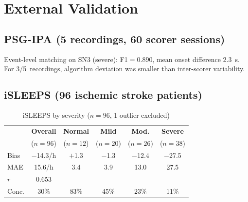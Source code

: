 \documentclass[11pt,a4paper]{article}
\begin{document}
\section{External Validation}

\subsection{PSG-IPA (5 recordings, 60 scorer sessions)}

\begin{table}[H]
\centering\small
\caption{PSG-IPA: algorithm vs.\ 12 scorers per recording}
\end{table}

\noindent Event-level matching on SN3 (severe): F1$=0.890$, mean onset
difference 2.3~s. For 3/5~recordings, algorithm deviation was smaller
than inter-scorer variability.

\subsection{iSLEEPS (96 ischemic stroke patients)}

\begin{table}[H]
\centering\small
\caption{iSLEEPS by severity ($n=96$, 1 outlier excluded)}
\begin{tabular}{@{}lccccc@{}}
\toprule
& \textbf{Overall} & \textbf{Normal} & \textbf{Mild} &
\textbf{Mod.} & \textbf{Severe} \\
& ($n=96$) & ($n=12$) & ($n=20$) & ($n=26$) & ($n=38$) \\
\midrule
Bias   & $-$14.3/h & $+$1.3 & $-$1.3 & $-$12.4 & $-$27.5 \\
MAE    & 15.6/h & 3.4 & 3.9 & 13.0 & 27.5 \\
$r$    & 0.653 &&&&\\
Conc.  & 30\% & 83\% & 45\% & 23\% & 11\% \\
\bottomrule
\end{tabular}
\end{table}
\end{document}
